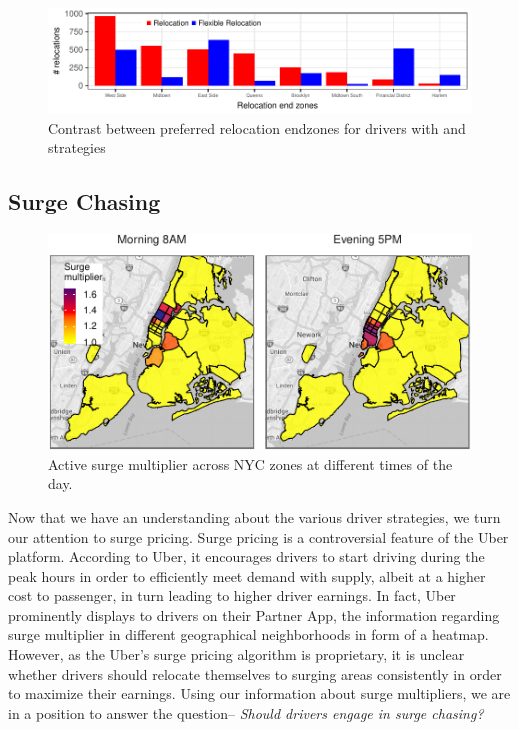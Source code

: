 \begin{figure}
	\centering
	\includegraphics{figures/relocation_endzones.pdf}
	\caption{Contrast between preferred relocation endzones for drivers with 
	{\relocation} and {\relocationflexible} strategies}
	\label{fig:relocation_endzones}
\end{figure}

\subsection{Surge Chasing}
\begin{figure}[H]
	\centering
	\includegraphics{figures/surge_heatmap.pdf}
	\caption{Active surge multiplier across NYC zones at different times of the day.}
	\label{fig:surge_heatmap}
\end{figure}
Now that we have an understanding about the various driver strategies, we turn our attention to surge pricing. Surge pricing is a controversial feature of the Uber platform. According to Uber, it encourages drivers to start driving during the peak hours in order to efficiently meet demand with supply, albeit at a higher cost to passenger, in turn leading to higher driver earnings. In fact, Uber prominently displays to drivers on their Partner App, the information regarding surge multiplier in different geographical neighborhoods in form of a heatmap. However, as the Uber's surge pricing algorithm is proprietary, it is unclear whether drivers should relocate themselves to surging areas consistently in order to maximize their earnings. Using our information about surge multipliers, we are in a position to answer the question-- \textit{Should drivers engage in surge chasing?}
